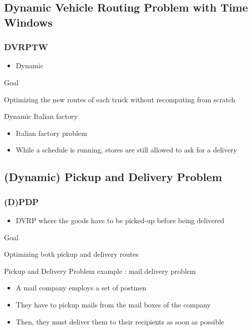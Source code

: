 \documentclass{beamer}
\begin{document}
\subsection*{Dynamic Vehicle Routing Problem with Time Windows}
\begin{frame}
	\frametitle{DVRPTW\cite{Mitrovic01}}
	\begin{itemize}
 		\item Dynamic
	\end{itemize}
	\begin{block}{Goal}
		\begin{center}
			Optimizing the new routes of each truck without recomputing from scratch
		\end{center}
	\end{block}	
	
	\begin{exampleblock}{Dynamic Italian factory}
		\begin{itemize}
			\item Italian factory problem
			\item While a schedule is running, stores are still allowed to ask for a delivery
		\end{itemize}
	\end{exampleblock}
\end{frame}

\subsection*{(Dynamic) Pickup and Delivery Problem}
\begin{frame}
 \frametitle{(D)PDP}
	\begin{itemize}
	 \item DVRP where the goods have to be picked-up before being delivered
	\end{itemize}
	
	\begin{block}{Goal}
		\begin{center}
			Optimizing both pickup and delivery routes
		\end{center}
	\end{block}	
	\begin{exampleblock}{Pickup and Delivery Problem example : mail delivery problem}
		\begin{itemize}
			\item A mail company employs a set of postmen
			\item They have to pickup mails from the mail boxes of the company
			\item Then, they must deliver them to their recipients as soon as possible
		\end{itemize}
	\end{exampleblock}

\end{frame}
\end{document}
